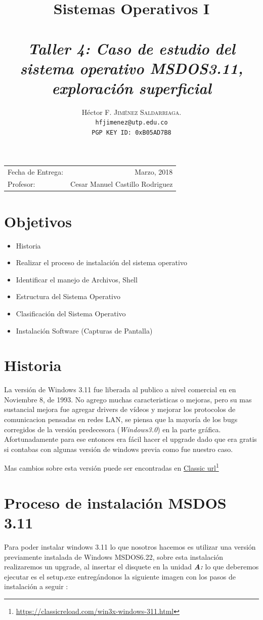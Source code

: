 \documentclass[paper=a4, fontsize=12pt]{article} 		%
\title{Sistemas Operativos I\\ 
\horrule{0.5pt} \\[0.4cm] 								%
\textit{Taller 4: Caso de estudio del sistema operativo MSDOS3.11, exploración superficial}
\horrule{1pt} \\[0.5cm] 			
}
\author{												
Héctor F. \textsc{Jiménez Saldarriaga.}\\				%
\texttt{hfjimenez@utp.edu.co} \\						
\texttt{PGP KEY ID: 0xB05AD7B8}
}
\date{}    						                       %
\newcommand\fnurl[2]{%
\href{#2}{#1}\footnote{\url{#2}}%
}
\numberwithin{equation}{section}						%
\numberwithin{table}{section} 							%
\begin{document}
\maketitle                      			           %
\begin{center}
\begin{tabular}{l r}								   %
Fecha de Entrega: & Marzo, 2018 \\				   %
Profesor: & Cesar Manuel Castillo Rodriguez
\end{tabular}
\end{center}
\section{Objetivos}
\begin{itemize}
	\item Historia
	\item Realizar el proceso de instalación del sistema operativo	
    \item Identificar el manejo de Archivos, Shell
    \item Estructura del Sistema Operativo
    \item Clasificación del Sistema Operativo
	\item Instalación Software (Capturas de Pantalla)
\end{itemize}
\section{Historia}
La versión de Windows 3.11 fue liberada al publico a nivel comercial en en Noviembre 8, de 1993. No agrego muchas caracteristicas o mejoras, pero su mas sustancial mejora fue agregar drivers de vídeos y mejorar los protocolos de comunicacion pensadas en redes LAN, se piensa que la mayoría de los bugs corregidos de la versión predecesora (\textit{Windows3.0}) en la parte gráfica. Afortunadamente para ese entonces era fácil hacer el upgrade dado que era gratis si contabas con algunas versión de windows previa como fue nuestro caso.

Mas cambios sobre esta versión puede ser encontradas en \fnurl{Classic url}{https://classicreload.com/win3x-windows-311.html}
\section{Proceso de instalación MSDOS 3.11}
Para poder instalar windows 3.11 lo que nosotros hacemos es utilizar una versión previamente instalada de Windows MSDOS6.22, sobre esta instalación realizaremos un upgrade, al insertar el disquete en la unidad \textbf{\textit{A:}} lo que deberemos ejecutar es el setup.exe entregándonos la siguiente imagen con los pasos de instalación a seguir : 
\end{document}

